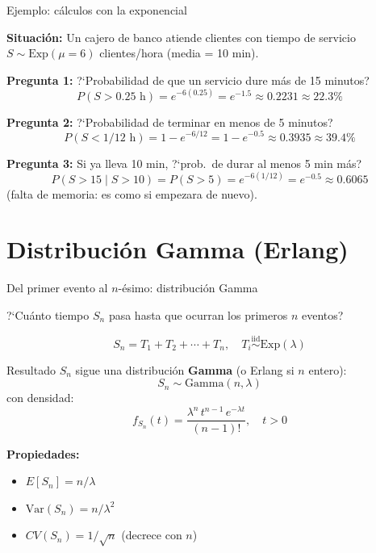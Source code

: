 \documentclass[aspectratio=1610, 9pt]{beamer}
\begin{document}
\begin{frame}{Ejemplo: c\'{a}lculos con la exponencial}

\textbf{Situaci\'{o}n:} Un cajero de banco atiende clientes con tiempo de servicio $S \sim \text{Exp}(\mu = 6)$ clientes/hora (media = 10 min).

\vspace{0.3cm}
\textbf{Pregunta 1:} ?`Probabilidad de que un servicio dure m\'{a}s de 15 minutos?
\[
P(S > 0.25\text{ h}) = e^{-6(0.25)} = e^{-1.5} \approx 0.2231 \approx 22.3\%
\]

\textbf{Pregunta 2:} ?`Probabilidad de terminar en menos de 5 minutos?
\[
P(S < 1/12\text{ h}) = 1 - e^{-6/12} = 1 - e^{-0.5} \approx 0.3935 \approx 39.4\%
\]

\textbf{Pregunta 3:} Si ya lleva 10 min, ?`prob.\ de durar al menos 5 min m\'{a}s?
\[
P(S > 15 \mid S > 10) = P(S > 5) = e^{-6(1/12)} = e^{-0.5} \approx 0.6065
\]
(falta de memoria: es como si empezara de nuevo).
\end{frame}

\section{Distribuci\'{o}n Gamma (Erlang)}

\begin{frame}{Del primer evento al $n$-\'{e}simo: distribuci\'{o}n Gamma}

?`Cu\'{a}nto tiempo $S_n$ pasa hasta que ocurran los primeros $n$ eventos?

\[
S_n = T_1 + T_2 + \cdots + T_n, \quad T_i \overset{\text{iid}}{\sim} \text{Exp}(\lambda)
\]

\begin{block}{Resultado}
$S_n$ sigue una distribuci\'{o}n \textbf{Gamma} (o Erlang si $n$ entero):
\[
S_n \sim \text{Gamma}(n, \lambda)
\]
con densidad:
\[
f_{S_n}(t) = \frac{\lambda^n\, t^{n-1}\, e^{-\lambda t}}{(n-1)!}, \quad t > 0
\]
\end{block}

\vspace{0.2cm}
\textbf{Propiedades:}
\begin{itemize}
    \item $E[S_n] = n/\lambda$
    \item $\text{Var}(S_n) = n/\lambda^2$
    \item $CV(S_n) = 1/\sqrt{n}$ (decrece con $n$)
\end{itemize}
\end{frame}
\end{document}
